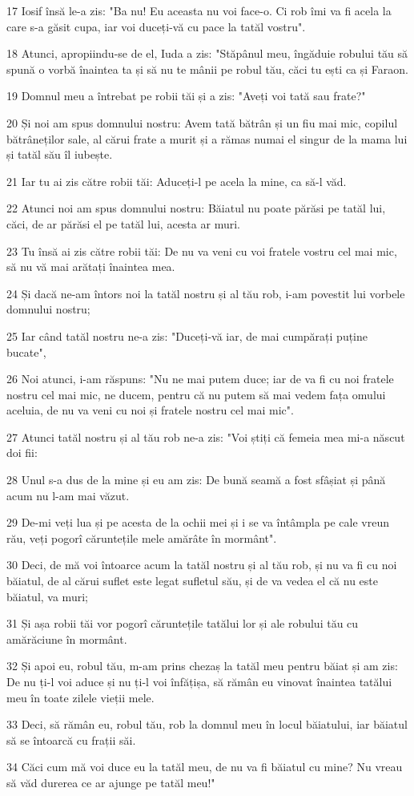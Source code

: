 \par 17 Iosif însă le-a zis: "Ba nu! Eu aceasta nu voi face-o. Ci rob îmi va fi acela la care s-a găsit cupa, iar voi duceți-vă cu pace la tatăl vostru".
\par 18 Atunci, apropiindu-se de el, Iuda a zis: "Stăpânul meu, îngăduie robului tău să spună o vorbă înaintea ta și să nu te mânii pe robul tău, căci tu ești ca și Faraon.
\par 19 Domnul meu a întrebat pe robii tăi și a zis: "Aveți voi tată sau frate?"
\par 20 Și noi am spus domnului nostru: Avem tată bătrân și un fiu mai mic, copilul bătrâneților sale, al cărui frate a murit și a rămas numai el singur de la mama lui și tatăl său îl iubește.
\par 21 Iar tu ai zis către robii tăi: Aduceți-l pe acela la mine, ca să-l văd.
\par 22 Atunci noi am spus domnului nostru: Băiatul nu poate părăsi pe tatăl lui, căci, de ar părăsi el pe tatăl lui, acesta ar muri.
\par 23 Tu însă ai zis către robii tăi: De nu va veni cu voi fratele vostru cel mai mic, să nu vă mai arătați înaintea mea.
\par 24 Și dacă ne-am întors noi la tatăl nostru și al tău rob, i-am povestit lui vorbele domnului nostru;
\par 25 Iar când tatăl nostru ne-a zis: "Duceți-vă iar, de mai cumpărați puține bucate",
\par 26 Noi atunci, i-am răspuns: "Nu ne mai putem duce; iar de va fi cu noi fratele nostru cel mai mic, ne ducem, pentru că nu putem să mai vedem fața omului aceluia, de nu va veni cu noi și fratele nostru cel mai mic".
\par 27 Atunci tatăl nostru și al tău rob ne-a zis: "Voi știți că femeia mea mi-a născut doi fii:
\par 28 Unul s-a dus de la mine și eu am zis: De bună seamă a fost sfâșiat și până acum nu l-am mai văzut.
\par 29 De-mi veți lua și pe acesta de la ochii mei și i se va întâmpla pe cale vreun rău, veți pogorî căruntețile mele amărâte în mormânt".
\par 30 Deci, de mă voi întoarce acum la tatăl nostru și al tău rob, și nu va fi cu noi băiatul, de al cărui suflet este legat sufletul său, și de va vedea el că nu este băiatul, va muri;
\par 31 Și așa robii tăi vor pogorî căruntețile tatălui lor și ale robului tău cu amărăciune în mormânt.
\par 32 Și apoi eu, robul tău, m-am prins chezaș la tatăl meu pentru băiat și am zis: De nu ți-l voi aduce și nu ți-l voi înfățișa, să rămân eu vinovat înaintea tatălui meu în toate zilele vieții mele.
\par 33 Deci, să rămân eu, robul tău, rob la domnul meu în locul băiatului, iar băiatul să se întoarcă cu frații săi.
\par 34 Căci cum mă voi duce eu la tatăl meu, de nu va fi băiatul cu mine? Nu vreau să văd durerea ce ar ajunge pe tatăl meu!"

